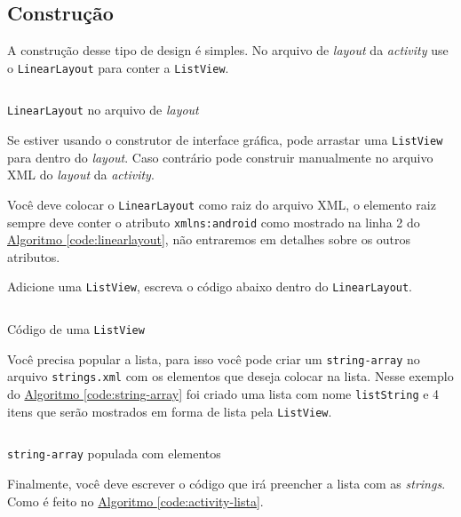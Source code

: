\documentclass[a4paper,12pt,brazil,oneside]{book}
\begin{document}
\begin{singlespace}
\subsection{Construção}

A construção desse tipo de design é simples. No arquivo de \emph{layout} da \emph{activity} use o \texttt{LinearLayout} para conter a \texttt{ListView}.

\begin{listing}[H]
\inputminted[linenos=true,fontsize=\small,frame=lines, framesep=2mm, tabsize=2,numbersep=5pt]{xml}{src/design/layout_linear.xml}
\caption{\texttt{LinearLayout} no arquivo de \emph{layout}}
\label{code:linearlayout}
\end{listing}

Se estiver usando o construtor de interface gráfica, pode arrastar uma \texttt{ListView} para dentro do \emph{layout}. Caso contrário pode construir manualmente no arquivo XML do \emph{layout} da \emph{activity}. 

Você deve colocar o \texttt{LinearLayout} como raiz do arquivo XML, o elemento raiz sempre deve conter o atributo \texttt{xmlns:android} como mostrado na linha 2 do \hyperref[code:linearlayout]{Algoritmo \ref*{code:linearlayout}}, não entraremos em detalhes sobre os outros atributos. 

Adicione uma \texttt{ListView}, escreva o código abaixo dentro do \texttt{LinearLayout}. 
\begin{listing}[H]
\inputminted[linenos=true,fontsize=\small,frame=lines, framesep=2mm, tabsize=2,numbersep=5pt]{xml}{src/design/listview.xml}
\caption{Código de uma \texttt{ListView}}
\end{listing}

Você precisa popular a lista, para isso você pode criar um \texttt{string-array} no arquivo \texttt{strings.xml} com os elementos que deseja colocar na lista. Nesse exemplo do \hyperref[code:string-array]{Algoritmo \ref*{code:string-array}} foi criado uma lista com nome \texttt{listString} e 4 itens que serão mostrados em forma de lista pela \texttt{ListView}.

\begin{listing}[H]
\inputminted[linenos=true,fontsize=\small,frame=lines, framesep=2mm, tabsize=2,numbersep=5pt]{xml}{src/design/string-array.xml}
\caption{\texttt{string-array} populada com elementos}
\label{code:string-array}
\end{listing}

Finalmente, você deve escrever o código que irá preencher a lista com as \emph{strings}. Como é feito no \hyperref[code:activity-lista]{Algoritmo \ref*{code:activity-lista}}.


\end{singlespace}
\end{document}
